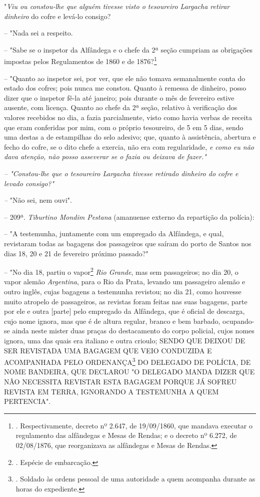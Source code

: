 "\emph{Viu ou constou-lhe que alguém tivesse visto o tesoureiro Largacha
retirar dinheiro} do cofre e levá-lo consigo?

-- "Nada sei a respeito.

-- "Sabe se o inspetor da Alfândega e o chefe da 2ª seção cumpriam as
obrigações impostas pelos Regulamentos de 1860 e de 1876?\footnote{.
  Respectivamente, decreto nº 2.647, de 19/09/1860, que mandava executar
  o regulamento das alfândegas e Mesas de Rendas; e o decreto nº 6.272,
  de 02/08/1876, que reorganizava as alfândegas e Mesas de Rendas.}

-- "Quanto ao inspetor sei, por ver, que ele não tomava semanalmente
conta do estado dos cofres; pois nunca me constou. Quanto à remessa de
dinheiro, posso dizer que o inspetor fê-la até janeiro; pois durante o
mês de fevereiro estive ausente, com licença. Quanto ao chefe da 2ª
seção, relativo à verificação dos valores recebidos no dia, a fazia
parcialmente, visto como havia verbas de receita que eram conferidas por
mim, com o próprio tesoureiro, de 5 em 5 dias, sendo uma destas a de
estampilhas do selo adesivo; que, quanto à assistência, abertura e fecho
do cofre, se o dito chefe a exercia, não era com regularidade, \emph{e
como eu não dava atenção, não posso asseverar se o fazia ou deixava de
fazer."}

\emph{-- "Constou-lhe que o tesoureiro Largacha tivesse retirado
dinheiro do cofre e levado consigo?"}

\emph{--} "Não sei, nem ouvi".

-- 209ª. \emph{Tiburtino Mondim Pestana} (amanuense externo da
repartição da polícia):

-- "A testemunha, juntamente com um empregado da Alfândega, e qual,
revistaram todas as bagagens dos passageiros que saíram do porto de
Santos nos dias 18, 20 e 21 de fevereiro próximo passado?"

-- "No dia 18, partiu o vapor\footnote{. Espécie de embarcação.}
\emph{Rio Grande}, mas sem passageiros; no dia 20, o vapor alemão
\emph{Argentina}, para o Rio da Prata, levando um passageiro alemão e
outro inglês, cujas bagagens a testemunha revistou; no dia 21, como
houvesse muito atropelo de passageiros, as revistas foram feitas nas
suas bagagens, parte por ele e outra {[}parte{]} pelo empregado da
Alfândega, que é oficial de descarga, cujo nome ignora, mas que é de
altura regular, branco e bem barbado, ocupando-se ainda neste mister
duas praças do destacamento do corpo policial, cujos nomes ignora, uma
das quais era italiano e outra crioulo; SENDO QUE DEIXOU DE SER
REVISTADA UMA BAGAGEM QUE VEIO CONDUZIDA E ACOMPANHADA PELO
ORDENANÇA\footnote{. Soldado às ordens pessoal de uma autoridade a quem
  acompanha durante as horas do expediente.} DO DELEGADO DE POLÍCIA, DE
NOME BANDEIRA, QUE DECLAROU "O DELEGADO MANDA DIZER QUE NÃO NECESSITA
REVISTAR ESTA BAGAGEM PORQUE JÁ SOFREU REVISTA EM TERRA, IGNORANDO A
TESTEMUNHA A QUEM PERTENCIA".

